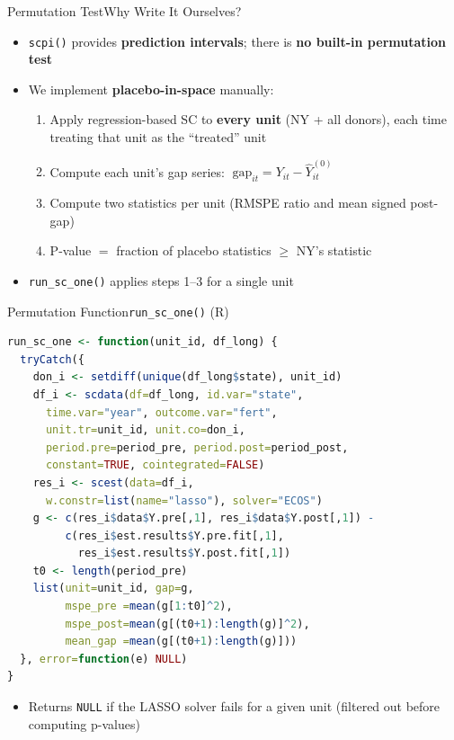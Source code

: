 \documentclass[hyperref={pdfpagelabels=false}]{beamer}
\begin{document}
\begin{frame}{Permutation Test}{Why Write It Ourselves?}
\begin{itemize}
    \item \texttt{scpi()} provides \textbf{prediction intervals}; there is
    \textbf{no built-in permutation test}
    \vspace{0.2cm}
    \item We implement \textbf{placebo-in-space} manually:
    \begin{enumerate}
        \vspace{0.1cm}
        \item Apply regression-based SC to \textbf{every unit} (NY + all donors),
        each time treating that unit as the ``treated'' unit
        \vspace{0.1cm}
        \item Compute each unit's gap series:
        $\;\text{gap}_{it} = Y_{it} - \hat{Y}_{it}^{(0)}$
        \vspace{0.1cm}
        \item Compute two statistics per unit (RMSPE ratio and mean signed post-gap)
        \vspace{0.1cm}
        \item P-value $=$ fraction of placebo statistics $\geq$ NY's statistic
    \end{enumerate}
    \vspace{0.2cm}
    \item \texttt{run\_sc\_one()} applies steps 1--3 for a single unit
\end{itemize}
\end{frame}


\begin{frame}[fragile]{Permutation Function}{\texttt{run\_sc\_one()} (R)}
\begin{lstlisting}[language=R, style=r-style]
run_sc_one <- function(unit_id, df_long) {
  tryCatch({
    don_i <- setdiff(unique(df_long$state), unit_id)
    df_i <- scdata(df=df_long, id.var="state",
      time.var="year", outcome.var="fert",
      unit.tr=unit_id, unit.co=don_i,
      period.pre=period_pre, period.post=period_post,
      constant=TRUE, cointegrated=FALSE)
    res_i <- scest(data=df_i,
      w.constr=list(name="lasso"), solver="ECOS")
    g <- c(res_i$data$Y.pre[,1], res_i$data$Y.post[,1]) -
         c(res_i$est.results$Y.pre.fit[,1],
           res_i$est.results$Y.post.fit[,1])
    t0 <- length(period_pre)
    list(unit=unit_id, gap=g,
         mspe_pre =mean(g[1:t0]^2),
         mspe_post=mean(g[(t0+1):length(g)]^2),
         mean_gap =mean(g[(t0+1):length(g)]))
  }, error=function(e) NULL)
}
\end{lstlisting}
\begin{itemize}
    \item Returns \texttt{NULL} if the LASSO solver fails for a given unit
    (filtered out before computing p-values)
\end{itemize}
\end{frame}
\end{document}
